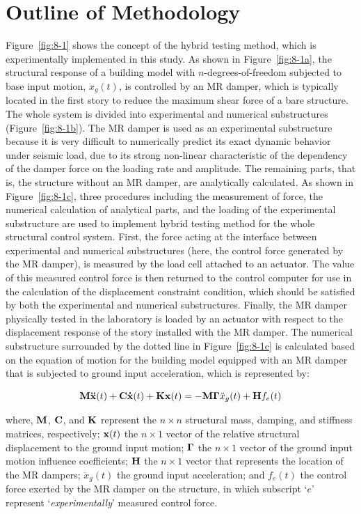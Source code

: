 \section{Outline of Methodology}
Figure~\ref{fig:8-1} shows the concept of the hybrid testing method, which is experimentally implemented in this study. As shown in Figure~\ref{fig:8-1a}, the structural response of a building model with $n$-degrees-of-freedom subjected to base input motion, $\ddot{x}_{g}(t)$, is controlled by an MR damper, which is typically located in the first story to reduce the maximum shear force of a bare structure. The whole system is divided into experimental and numerical substructures (Figure~\ref{fig:8-1b}). The MR damper is used as an experimental substructure because it is very difficult to numerically predict its exact dynamic behavior under seismic load, due to its strong non-linear characteristic of the dependency of the damper force on the loading rate and amplitude. The remaining parts, that is, the structure without an MR damper, are analytically calculated. As shown in Figure~\ref{fig:8-1c}, three procedures including the measurement of force, the numerical calculation of analytical parts, and the loading of the experimental substructure are used to implement hybrid testing method for the whole structural control system\citep{blakeborough2001development}. First, the force acting at the interface between experimental and numerical substructures (here, the control force generated by the MR damper), is measured by the load cell attached to an actuator. The value of this measured control force is then returned to the control computer for use in the calculation of the displacement constraint condition, which should be satisfied by both the experimental and numerical substructures. Finally, the MR damper physically tested in the laboratory is loaded by an actuator with respect to the displacement response of the story installed with the MR damper. The numerical substructure surrounded by the dotted line in Figure~\ref{fig:8-1c} is calculated based on the equation of motion for the building model equipped with an MR damper that is subjected to ground input acceleration, which is represented by:

\begin{equation}\label{eq:8-1}
\mathbf{M}\mathbf{\ddot{x}}(t)+\mathbf{C}\mathbf{\dot{x}}(t)+\mathbf{K}\mathbf{x}(t) = -\mathbf{M}\mathbf{\Gamma}\ddot{x}_{g}(t)+\mathbf{H}f_{e}(t)
\end{equation}

where, $\mathbf{M}$, $\mathbf{C}$, and $\mathbf{K}$ represent the $n \times n$ structural mass, damping, and stiffness matrices, respectively; $\mathbf{x}(t)$ the $n\times 1$ vector of the relative structural displacement to the ground input motion; $\mathbf{\Gamma}$ the $n\times1$ vector of the ground input motion influence coefficients; $\mathbf{H}$ the $n \times 1$ vector that represents the location of the MR dampers; $\ddot{x}_{g}(t)$ the ground input acceleration; and $f_{e}(t)$ the
control force exerted by the MR damper on the structure, in which subscript `$e$' represent `\textit{experimentally}' measured control force.

